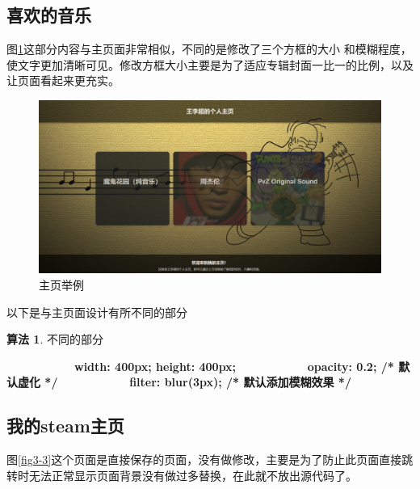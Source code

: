 \documentclass[supercite]{Experimental_Report}
\theoremstyle{definition}
\newtheorem{alg}{算法}[section]
\begin{document}
\subsection{喜欢的音乐}

图\ref{fig3-2}这部分内容与主页面非常相似，不同的是修改了三个方框的大小 和模糊程度，使文字更加清晰可见。修改方框大小主要是为了适应专辑封面一比一的比例，以及让页面看起来更充实。

\begin{figure}[htb]
	\begin{center}
		\includegraphics[scale=0.30]{images/3-2.png}
		\caption{主页举例}
		\label{fig3-2}
	\end{center}
\end{figure}

以下是与主页面设计有所不同的部分
\begin{shaded*}
	\begin{alg}{不同的部分}
		\label{alg:1}
		\begin{algorithmic}
			\State \ \ \ \ \ \ \ \ \ \ \ \ \textbf{width: 400px;  height: 400px; }
			\State \ \ \ \ \ \ \ \ \ \ \ \ \textbf{opacity: 0.2; /* 默认虚化 */}
			\State \ \ \ \ \ \ \ \ \ \ \ \ \textbf{filter: blur(3px); /* 默认添加模糊效果 */}
		\end{algorithmic}
	\end{alg}
	\end{shaded*}

\subsection{我的steam主页}

图\ref{fig3-3}这个页面是直接保存的页面，没有做修改，主要是为了防止此页面直接跳转时无法正常显示页面背景没有做过多替换，在此就不放出源代码了。
\end{document}
